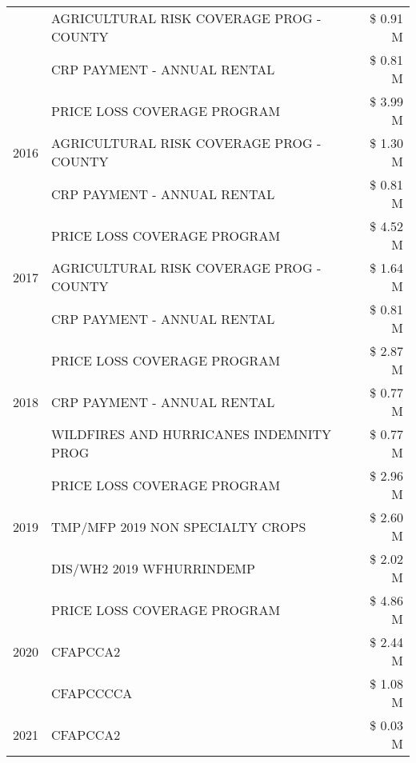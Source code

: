 \begin{tabular}{llr}
 & AGRICULTURAL RISK COVERAGE PROG - COUNTY & \$ 0.91 M \\
 & CRP PAYMENT - ANNUAL RENTAL & \$ 0.81 M \\
\cline{1-3}
\multirow[t]{3}{*}{2016} & PRICE LOSS COVERAGE PROGRAM                   & \$ 3.99 M \\
 & AGRICULTURAL RISK COVERAGE PROG - COUNTY      & \$ 1.30 M \\
 & CRP PAYMENT - ANNUAL RENTAL                   & \$ 0.81 M \\
\cline{1-3}
\multirow[t]{3}{*}{2017} & PRICE LOSS COVERAGE PROGRAM & \$ 4.52 M \\
 & AGRICULTURAL RISK COVERAGE PROG - COUNTY & \$ 1.64 M \\
 & CRP PAYMENT - ANNUAL RENTAL & \$ 0.81 M \\
\cline{1-3}
\multirow[t]{3}{*}{2018} & PRICE LOSS COVERAGE PROGRAM & \$ 2.87 M \\
 & CRP PAYMENT - ANNUAL RENTAL & \$ 0.77 M \\
 & WILDFIRES AND HURRICANES INDEMNITY PROG & \$ 0.77 M \\
\cline{1-3}
\multirow[t]{3}{*}{2019} & PRICE LOSS COVERAGE PROGRAM & \$ 2.96 M \\
 & TMP/MFP 2019 NON SPECIALTY CROPS & \$ 2.60 M \\
 & DIS/WH2 2019 WFHURRINDEMP & \$ 2.02 M \\
\cline{1-3}
\multirow[t]{3}{*}{2020} & PRICE LOSS COVERAGE PROGRAM & \$ 4.86 M \\
 & CFAPCCA2 & \$ 2.44 M \\
 & CFAPCCCCA & \$ 1.08 M \\
\cline{1-3}
2021 & CFAPCCA2 & \$ 0.03 M \\
\cline{1-3}
\bottomrule
\end{tabular}
